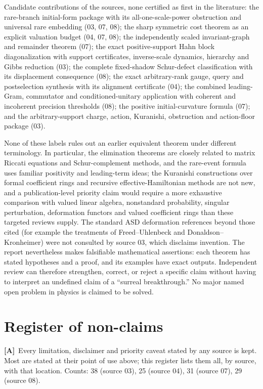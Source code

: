 \documentclass[11pt,oneside]{article}
\numberwithin{equation}{section}
\theoremstyle{plain}
\theoremstyle{definition}
\theoremstyle{remark}
\newcommand{\TA}{\textcolor{TierA}{\textsf{\bfseries[A]}}}
\begin{document}
Candidate contributions of the sources, none certified as first in the literature: the rare-branch initial-form package with its all-one-scale-power obstruction and universal rare embedding (03, 07, 08); the sharp symmetric cost theorem as an explicit valuation budget (04, 07, 08); the independently scaled invariant-graph and remainder theorem (07); the exact positive-support Hahn block diagonalization with support certificates, inverse-scale dynamics, hierarchy and Gibbs reduction (03); the complete fixed-shadow Schur-defect classification with its displacement consequence (08); the exact arbitrary-rank gauge, query and postselection synthesis with its alignment certificate (04); the combined leading-Gram, commutator and conditioned-unitary application with coherent and incoherent precision thresholds (08); the positive initial-curvature formula (07); and the arbitrary-support charge, action, Kuranishi, obstruction and action-floor package (03).

None of these labels rules out an earlier equivalent theorem under different terminology. In particular, the elimination theorems are closely related to matrix Riccati equations and Schur-complement methods, and the rare-event formula uses familiar positivity and leading-term ideas; the Kuranishi constructions over formal coefficient rings and recursive effective-Hamiltonian methods are not new, and a publication-level priority claim would require a more exhaustive comparison with valued linear algebra, nonstandard probability, singular perturbation, deformation functors and valued coefficient rings than these targeted reviews supply. The standard ASD deformation references beyond those cited (for example the treatments of Freed--Uhlenbeck and Donaldson--Kronheimer) were not consulted by source 03, which disclaims invention. The report nevertheless makes falsifiable mathematical assertions: each theorem has stated hypotheses and a proof, and its examples have exact outputs. Independent review can therefore strengthen, correct, or reject a specific claim without having to interpret an undefined claim of a ``surreal breakthrough.'' No major named open problem in physics is claimed to be solved.

\section{Register of non-claims}\label{qgs:app:nonclaims}
\TA\ Every limitation, disclaimer and priority caveat stated by any source is kept. Most are stated at their point of use above; this register lists them all, by source, with that location. Counts: 38 (source 03), 25 (source 04), 31 (source 07), 29 (source 08).
\end{document}

